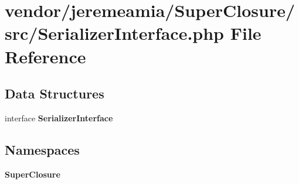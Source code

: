 \section{vendor/jeremeamia/\+Super\+Closure/src/\+Serializer\+Interface.php File Reference}
\label{_serializer_interface_8php}
\subsection*{Data Structures}
\begin{DoxyCompactItemize}
\item 
interface {\bf Serializer\+Interface}
\end{DoxyCompactItemize}
\subsection*{Namespaces}
\begin{DoxyCompactItemize}
\item 
 {\bf Super\+Closure}
\end{DoxyCompactItemize}
